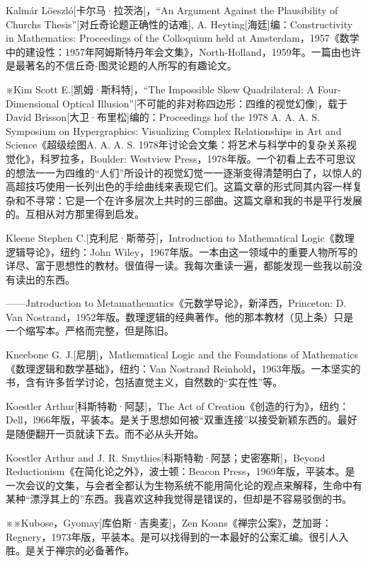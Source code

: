 \documentclass[
  12pt,
  twoside,
  openright,
  oldfontcommands,
]{memoir}
\begin{document}
Kalmár Löeszló{[}卡尔马·拉茨洛{]}，``An Argument Against the Plausibility of Church\textquotesingle s Thesis''{[}对丘奇论题正确性的诘难{]}, A. Heyting{[}海廷{]}编：Constructivity in Mathematics: Proceedings of the Colloquium held at Amsterdam，1957《数学中的建设性：1957年阿姆斯特丹年会文集》，North-Holland，1959年。一篇由也许是最著名的不信丘奇-图灵论题的人所写的有趣论文。

※Kim Scott E.{[}凯姆·斯科特{]}，``The Impossible Skew Quadrilateral: A Four-Dimensional Optical Illusion''{[}不可能的非对称四边形：四维的视觉幻像{]}，载于David Brisson{[}大卫·布里松{]}编的：Proceedings hof the 1978 A. A. A. S. Symposium on Hypergraphics: Visualizing Complex Relationships in Art and Science《超级绘图A. A. A. S. 1978年讨论会文集：将艺术与科学中的复杂关系视觉化》，科罗拉多，Boulder: Westview Press，1978年版。一个初看上去不可思议的想法一一为四维的``人们''所设计的视觉幻觉一一逐渐变得清楚明白了，以惊人的高超技巧使用一长列出色的手绘曲线来表现它们。这篇文章的形式同其内容一样复杂和不寻常：它是一个在许多层次上共时的三部曲。这篇文章和我的书是平行发展的。互相从对方那里得到启发。

Kleene Stephen C.{[}克利尼·斯蒂芬{]}，Introduction to Mathematical Logic《数理逻辑导论》，纽约：John Wiley，1967年版。一本由这一领域中的重要人物所写的详尽、富于思想性的教材。很值得一读。我每次重读一遍，都能发现一些我以前没有读出的东西。

------Jntroduction to Metamathematics《元数学导论》，新泽西，Princeton: D. Van Nostrand，1952年版。数理逻辑的经典著作。他的那本教材（见上条）只是一个缩写本。严格而完整，但是陈旧。

Kneebone G. J.{[}尼朋{]}，Mathematical Logic and the Foundations of Mathematics《数理逻辑和数学基础》，纽约：Van Nostrand Reinhold，1963年版。一本坚实的书，含有许多哲学讨论，包括直觉主义，自然数的``实在性''等。

Koestler Arthur{[}科斯特勒·阿瑟{]}，The Act of Creation《创造的行为》，纽约：Dell，l966年版，平装本。是关于思想如何被``双重连接''以接受新颖东西的。最好是随便翻开一页就读下去。而不必从头开始。

Koestler Arthur and J. R. Smythies{[}科斯特勒·阿瑟；史密塞斯{]}，Beyond Reductionism《在简化论之外》，波士顿：Beacon Press，1969年版，平装本。是一次会议的文集，与会者全都认为生物系统不能用简化论的观点来解释，生命中有某种``漂浮其上的''东西。我喜欢这种我觉得是错误的，但却是不容易驳倒的书。

※※Kubose，Gyomay{[}库伯斯·吉奥麦{]}，Zen Koans《禅宗公案》，芝加哥：Regnery，1973年版，平装本。是可以找得到的一本最好的公案汇编。很引人入胜。是关于禅宗的必备著作。
\end{document}
